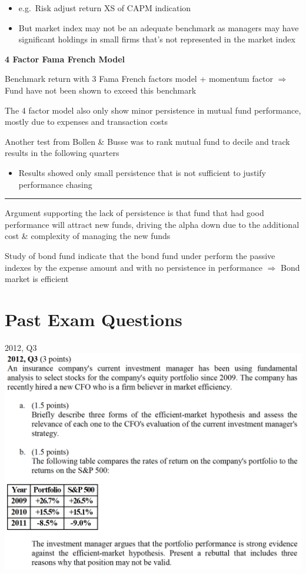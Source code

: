 \documentclass[]{book}
\providecommand{\tightlist}{%
  \setlength{\itemsep}{0pt}\setlength{\parskip}{0pt}}
\theoremstyle{definition}
\theoremstyle{definition}
\theoremstyle{remark}
\begin{document}
\begin{itemize}
\item
  e.g.~Risk adjust return XS of CAPM indication
\item
  But market index may not be an adequate benchmark as managers may have
  significant holdings in small firms that's not represented in the
  market index
\end{itemize}

\textbf{4 Factor Fama French Model}

Benchmark return with 3 Fama French factors model + momentum factor
\(\Rightarrow\) Fund have not been shown to exceed this benchmark

The 4 factor model also only show minor persistence in mutual fund
performance, mostly due to expenses and transaction costs

Another test from Bollen \& Busse was to rank mutual fund to decile and
track results in the following quarters

\begin{itemize}
\tightlist
\item
  Results showed only small persistence that is not sufficient to
  justify performance chasing
\end{itemize}

\begin{center}\rule{0.5\linewidth}{\linethickness}\end{center}

Argument supporting the lack of persistence is that fund that had good
performance will attract new funds, driving the alpha down due to the
additional cost \& complexity of managing the new funds

Study of bond fund indicate that the bond fund under perform the passive
indexes by the expense amount and with no persistence in performance
\(\Rightarrow\) Bond market is efficient

\section{Past Exam Questions}\label{past-exam-questions-5}

 2012, Q3 \includegraphics{questions/2012-3Q.png}
\end{document}
